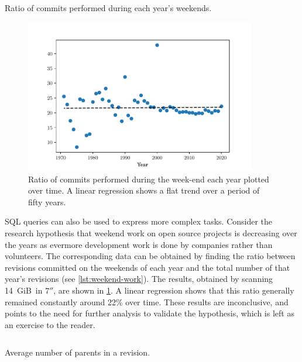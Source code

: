 \begin{listing}
    \inputminted[firstline=3]{sql}{codesamples/graph-dataset/weekend-work.sql}
    \caption{Ratio of commits performed during each year's weekends.}%
    \label{lst:weekend-work}
\end{listing}

\begin{figure}
    \centering
    \includegraphics[width=0.9\textwidth]{img/graph-dataset/weekend-work}
    \caption{Ratio of commits performed during the week-end each year plotted
    over time. A linear regression shows a flat trend over a period of fifty
    years.}%
    \label{fig:weekend-work}
\end{figure}


SQL queries can also be used to express more complex tasks.  Consider the
research hypothesis that weekend work on open source projects is decreasing
over the years as evermore development work is done by companies rather than
volunteers.  The corresponding data can be obtained by finding the ratio
between revisions committed on the weekends of each year and the total number
of that year's revisions (see \cref{lst:weekend-work}).
The results, obtained by scanning 14~GiB\ in $7''$, are shown in
\cref{fig:weekend-work}. A linear regression shows that this ratio generally
remained constantly around 22\% over time. These results are inconclusive, and
points to the need for further analysis to validate the hypothesis, which is
left as an exercise to the reader.

\begin{listing}
    \inputminted[firstline=4]{sql}{codesamples/graph-dataset/fork-size.sql}
    \caption{Average number of parents in a revision.}%
    \label{lst:fork-size}
\end{listing}

